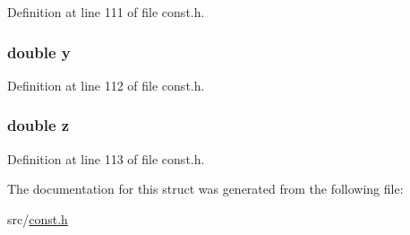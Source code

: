 Definition at line 111 of file const.\+h.

\hypertarget{structd__particle_ab927965981178aa1fba979a37168db2a}{}
\subsubsection[{y}]{\setlength{\rightskip}{0pt plus 5cm}double y}\label{structd__particle_ab927965981178aa1fba979a37168db2a}


Definition at line 112 of file const.\+h.

\hypertarget{structd__particle_ab3e6ed577a7c669c19de1f9c1b46c872}{}
\subsubsection[{z}]{\setlength{\rightskip}{0pt plus 5cm}double z}\label{structd__particle_ab3e6ed577a7c669c19de1f9c1b46c872}


Definition at line 113 of file const.\+h.



The documentation for this struct was generated from the following file\+:\begin{DoxyCompactItemize}
\item 
src/\hyperlink{const_8h}{const.\+h}\end{DoxyCompactItemize}
